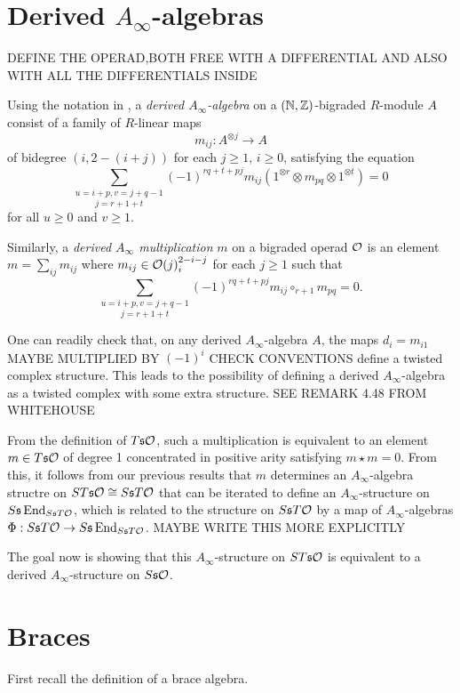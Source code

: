 \documentclass[twoside]{article}
\begin{document}
\section{Derived $A_\infty$-algebras}
DEFINE THE OPERAD,BOTH FREE WITH A DIFFERENTIAL AND ALSO WITH ALL THE DIFFERENTIALS INSIDE
  \begin{definition}
  Using the notation in \cite{RW}, a \emph{derived $A_\infty$-algebra} on a $(\mathbb{N},\mathbb{Z})$-bigraded $R$-module $A$ consist of a family of $R$-linear maps 
\[m_{ij}:A^{\otimes j}\to A\]
of bidegree $(i,2-(i+j))$ for each $j\geq 1$, $i\geq 0$, satisfying the equation
\[\underset{j=r+1+t}{\sum_{u=i+p, v=j+q-1}}(-1)^{rq+t+pj}m_{ij}(1^{\otimes r}\otimes m_{pq}\otimes 1^{\otimes t})=0\]
for all $u\geq 0$ and $v\geq 1$. 


Similarly, a \emph{derived $A_\infty$ multiplication} $m$ on a bigraded operad ${\mathcal O}$ is an element $m=\sum_{ij}m_{ij}$ where $m_{ij}\in{\mathcal O}(j)^{2-i-j}_i$ for each $j\geq 1$ such that 
\[\underset{j=r+1+t}{\sum_{u=i+p, v=j+q-1}}(-1)^{rq+t+pj}m_{ij}\circ_{r+1} m_{pq}=0.\]
\end{definition}
\begin{remark}
One can readily check that, on any derived $A_\infty$-algebra $A$, the maps $d_i=m_{i1}$ MAYBE MULTIPLIED BY $(-1)^i$ CHECK CONVENTIONS define a twisted complex structure. This leads to the possibility of defining a derived $A_\infty$-algebra as a twisted complex with some extra structure. SEE  REMARK 4.48 FROM WHITEHOUSE
\end{remark}
From the definition of $T\mathfrak{s}{\mathcal O}$, such a multiplication is equivalent to an element $m\in T\mathfrak{s}{\mathcal O}$ of degree 1 concentrated in positive arity satisfying $m\star m=0$. From this, it follows from our previous results that $m$ determines an $A_\infty$-algebra structre on $ST\mathfrak{s}{\mathcal O}\cong S\mathfrak{s} T{\mathcal O}$ %
that can be iterated to define an $A_\infty$-structure on $S\mathfrak{s}\operatorname{End}_{S\mathfrak{s} T{\mathcal O}}$, which is related to the structure on $S\mathfrak{s} T{\mathcal O}$ by a map of $A_\infty$-algebras  $\Phi:S\mathfrak{s} T{\mathcal O}
\to  S\mathfrak{s}\operatorname{End}_{S\mathfrak{s} T{\mathcal O}}$.  MAYBE WRITE THIS MORE EXPLICITLY 

The goal now is showing that this $A_\infty$-structure on $ST\mathfrak{s}{\mathcal O}$ is equivalent to a derived $A_\infty$-structure on $S\mathfrak{s} {\mathcal O}$. 


\section{Braces}\label{sectionbraces}
First recall the definition of a brace algebra.
\end{document}
